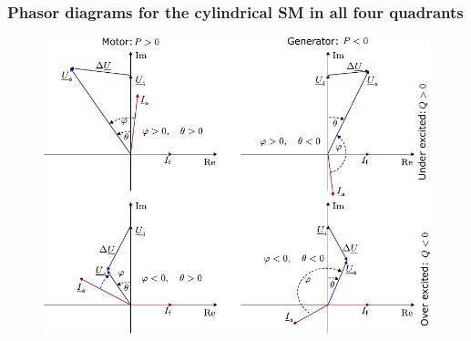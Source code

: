 \begin{frame}
	\frametitle{Phasor diagrams for the cylindrical SM in all four quadrants} 
	\begin{figure}
		\centering
		\includegraphics[height=0.85\textheight]{fig/lec07/Phasor_diagrams_4Q.pdf}
	\end{figure}
\end{frame}
